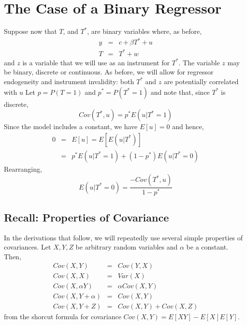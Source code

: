 
\section{The Case of a Binary Regressor}

Suppose now that $T$, and $T^*$, are binary variables where, as before,
\begin{eqnarray}
  y &=&  c + \beta T^* + u \\
  T &=& T^* + w
\end{eqnarray}
and $z$ is a variable that we will use as an instrument for $T^*$.
The variable $z$ may be binary, discrete or continuous.
As before, we will allow for regressor endogeneity and instrument invalidity: both $T^*$ and $z$ are potentially correlated with $u$
Let $p = P(T = 1)$ and $p^* = P(T^*=1)$ and note that, since $T^*$ is discrete,
\begin{equation}
  Cov(T^*,u) = p^* E\left( u|T^*=1 \right)
  \label{eq:CovTstarU}
\end{equation}
Since the model includes a constant, we have $E[u]=0$ and hence,
\begin{eqnarray*}
  0 &=& E[u] =   E\left[ E\left( u|T^*\right) \right]\\
  &=&  p^* E\left( u|T^*=1 \right) + \left( 1-p^* \right)E\left( u|T^*=0 \right)
\end{eqnarray*}
Rearranging,
\begin{equation}
  E\left( u|T^*=0 \right) = \frac{-Cov(T^*,u)}{1-p^*}
  \label{eq:uTstar0}
\end{equation}

\subsection*{Recall: Properties of Covariance}
In the derivations that follow, we will repeatedly use several simple properties of covariances.
Let $X, Y, Z$ be arbitrary random variables and $\alpha$ be a constant.
Then,
\begin{eqnarray*}
  Cov(X, Y) &=&  Cov(Y, X)\\
  Cov(X, X) &=&  Var(X)\\
  Cov(X, \alpha Y) &=& \alpha Cov(X,Y)\\
  Cov(X, Y + \alpha) &=&  Cov(X, Y)\\
  Cov(X, Y + Z) &=& Cov(X, Y) + Cov(X, Z)
\end{eqnarray*}
from the shorcut formula for covariance $Cov(X,Y) = E[XY] - E[X]E[Y]$.

